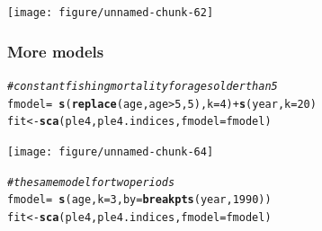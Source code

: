 \documentclass[a4paper,english,10pt]{article}\usepackage[]{graphicx}\usepackage[]{color}
\makeatletter
\newcommand{\hlnum}[1]{\textcolor[rgb]{0.686,0.059,0.569}{#1}}%
\newcommand{\hlcom}[1]{\textcolor[rgb]{0.678,0.584,0.686}{\textit{#1}}}%
\newcommand{\hlopt}[1]{\textcolor[rgb]{0,0,0}{#1}}%
\newcommand{\hlstd}[1]{\textcolor[rgb]{0.345,0.345,0.345}{#1}}%
\newcommand{\hlkwb}[1]{\textcolor[rgb]{0.69,0.353,0.396}{#1}}%
\newcommand{\hlkwc}[1]{\textcolor[rgb]{0.333,0.667,0.333}{#1}}%
\newcommand{\hlkwd}[1]{\textcolor[rgb]{0.737,0.353,0.396}{\textbf{#1}}}%
\newenvironment{kframe}{%
 \def\at@end@of@kframe{}%
 \ifinner\ifhmode%
  \def\at@end@of@kframe{\end{minipage}}%
  \begin{minipage}{\columnwidth}%
 \fi\fi%
 \def\FrameCommand##1{\hskip\@totalleftmargin \hskip-\fboxsep
 \colorbox{shadecolor}{##1}\hskip-\fboxsep
     \hskip-\linewidth \hskip-\@totalleftmargin \hskip\columnwidth}%
 \MakeFramed {\advance\hsize-\width
   \@totalleftmargin\z@ \linewidth\hsize
   \@setminipage}}%
 {\par\unskip\endMakeFramed%
 \at@end@of@kframe}
\newenvironment{knitrout}{}{} %
\makeatother
\begin{document}
\begin{knitrout}
\color{fgcolor}

{\centering \texttt{[image: figure/unnamed-chunk-62]} 

}



\end{knitrout}


\subsubsection{More models}

\begin{knitrout}
\color{fgcolor}\begin{kframe}
\begin{alltt}
\hlcom{# constant fishing mortality for ages older than 5}
\hlstd{fmodel} \hlkwb{=} \hlopt{~}\hlkwd{s}\hlstd{(}\hlkwd{replace}\hlstd{(age, age} \hlopt{>} \hlnum{5}\hlstd{,} \hlnum{5}\hlstd{),} \hlkwc{k} \hlstd{=} \hlnum{4}\hlstd{)} \hlopt{+} \hlkwd{s}\hlstd{(year,} \hlkwc{k} \hlstd{=} \hlnum{20}\hlstd{)}
\hlstd{fit} \hlkwb{<-} \hlkwd{sca}\hlstd{(ple4, ple4.indices,} \hlkwc{fmodel} \hlstd{= fmodel)}
\end{alltt}
\end{kframe}
\end{knitrout}


\begin{knitrout}
\color{fgcolor}

{\centering \texttt{[image: figure/unnamed-chunk-64]} 

}



\end{knitrout}


\begin{knitrout}
\color{fgcolor}\begin{kframe}
\begin{alltt}
\hlcom{# the same model for two periods}
\hlstd{fmodel} \hlkwb{=} \hlopt{~}\hlkwd{s}\hlstd{(age,} \hlkwc{k} \hlstd{=} \hlnum{3}\hlstd{,} \hlkwc{by} \hlstd{=} \hlkwd{breakpts}\hlstd{(year,} \hlnum{1990}\hlstd{))}
\hlstd{fit} \hlkwb{<-} \hlkwd{sca}\hlstd{(ple4, ple4.indices,} \hlkwc{fmodel} \hlstd{= fmodel)}
\end{alltt}
\end{kframe}
\end{knitrout}
\end{document}
